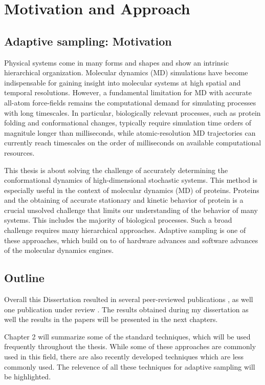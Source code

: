 \chapter{Motivation and Approach}

\section{Adaptive sampling: Motivation}
Physical systems come in many forms and shapes and show an intrinsic hierarchical organization. Molecular dynamics (MD) simulations have become indispensable for gaining
insight into molecular systems at high spatial and temporal resolutions.
However, a fundamental limitation for MD with accurate all-atom force-fields remains
the computational demand for simulating processes with long timescales. In
particular, biologically relevant processes, such as protein folding and
conformational changes, typically require simulation time orders of magnitule longer than
milliseconds, while atomic-resolution MD trajectories can currently reach
timescales on the order of milliseconds on available computational resources. 

This thesis is about solving the challenge of accurately determining the conformational dynamics of high-dimensional stochastic systems. This method is especially useful in the context of molecular dynamics (MD) of proteins. Proteins and the obtaining of accurate stationary and kinetic behavior of protein is a crucial unsolved challenge that limits our understanding of the behavior of many systems. This includes the majority of biological processes. Such a broad challenge requires many hierarchical approaches. Adaptive sampling is one of these approaches, which build on to of hardware advances and software advances of the molecular dynamics engines.

\section{Outline}
 
 Overall this Dissertation resulted in several peer-reviewed publications \cite{Adstrategies2018, Extasy2016}, as well one publication under review \cite{Extasy2019}. The results obtained during my dissertation as well the results in the papers will be presented in the next chapters.
 
Chapter 2 will summarize some of the standard techniques, which will be used frequently throughout the thesis. While some of these approaches are commonly used in this field, there are also recently developed techniques which are less commonly used. The relevence of all these techniques for adaptive sampling will be highlighted. 

